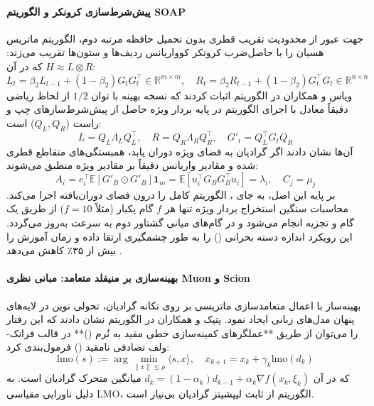 \paragraph*{پیش‌شرط‌سازی کرونکر و الگوریتم SOAP}
جهت عبور از محدودیت تقریب قطری بدون تحمیل حافظه مرتبه دوم، الگوریتم  \cite{gupta2018shampoo} ماتریس هسیان را با حاصل‌ضرب کرونکر کوواریانس ردیف‌ها و ستون‌ها تقریب می‌زند: $H \approx L \otimes R$ که در آن:
\begin{equation}
    L_t = \beta_2 L_{t-1} + (1-\beta_2) G_t G_t^\top \in \mathbb{R}^{m \times m}, \quad R_t = \beta_2 R_{t-1} + (1-\beta_2) G_t^\top G_t \in \mathbb{R}^{n \times n}
\end{equation}
ویاس و همکاران در الگوریتم  \cite{vyas2025soap} اثبات کردند که نسخه بهینه  با توان $1/2$ از لحاظ ریاضی دقیقاً معادل با اجرای الگوریتم  در پایه بردار ویژه حاصل از پیش‌شرط‌سازهای چپ و راست ($Q_L, Q_R$) است:
\begin{equation}
    L = Q_L \Lambda_L Q_L^\top, \quad R = Q_R \Lambda_R Q_R^\top, \quad G'_t = Q_L^\top G_t Q_R
\end{equation}
آن‌ها نشان دادند اگر گرادیان به فضای ویژه دوران یابد، همبستگی‌های متقاطع قطری شده و مقادیر واریانس دقیقاً بر مقادیر ویژه منطبق می‌شوند:
\begin{equation}
    A_i = e_i^\top \mathbb{E}[G'_B \odot G'_B] \mathbf{1}_m = \mathbb{E}[u_i^\top G_B G_B^\top u_i] = \lambda_i, \quad C_j = \mu_j
\end{equation}
بر پایه این اصل،  به جای ، الگوریتم کامل  را درون فضای دوران‌یافته اجرا می‌کند. محاسبات سنگین استخراج بردار ویژه تنها هر $f$ گام یکبار (مثلاً $f=10$) از طریق یک گام  و تجزیه  انجام می‌شود و در گام‌های میانی گشتاور دوم به سرعت به‌روز می‌گردد. این رویکرد اندازه دسته بحرانی () را به طور چشمگیری ارتقا داده و زمان آموزش را بیش از ۳۵٪ کاهش می‌دهد \cite{vyas2025soap}.

\paragraph*{بهینه‌سازی بر منیفلد متعامد: مبانی نظری Muon و Scion}
بهینه‌ساز  \cite{jordan2024muon} با اعمال متعامدسازی ماتریسی بر روی تکانه گرادیان، تحولی نوین در لایه‌های پنهان مدل‌های زبانی ایجاد نمود. پتیک و همکاران در الگوریتم  \cite{pethick2025training} نشان دادند که این رفتار را می‌توان از طریق **عملگرهای کمینه‌سازی خطی مقید به نُرم ()** در قالب فرانک-ولف تصادفی نامقید () فرمول‌بندی کرد:
\begin{equation}
    \text{lmo}(s) := \arg\min_{\|x\| \le \rho} \langle s, x \rangle, \quad x_{k+1} = x_k + \gamma_k \text{lmo}(d_k)
\end{equation}
که در آن $d_k = (1-\alpha_k)d_{k-1} + \alpha_k \nabla f(x_k, \xi_k)$ میانگین متحرک گرادیان است. به دلیل ناورایی مقیاسی LMO، الگوریتم از ثابت لیپشیتز گرادیان بی‌نیاز است.

